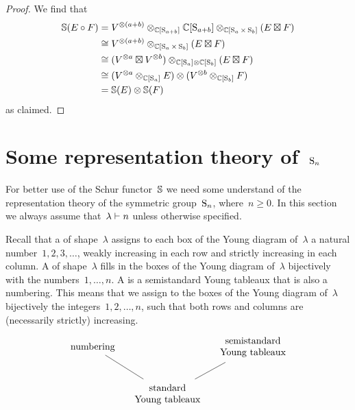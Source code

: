 \documentclass[a4paper,10pt]{scrartcl}
\begin{document}
\begin{proof}
  We find that
  \begin{align*}
    \mathbb{S}(E \circ F)
    &=
    V^{\otimes (a+b)}
    \otimes_{\mathbb{C}[\operatorname{S}_{a+b}]}
    \mathbb{C}[\operatorname{S}_{a+b}]
    \otimes_{\mathbb{C}[\operatorname{S}_a \times \operatorname{S}_b]}
    (E \boxtimes F)
    \\
    &\cong
    V^{\otimes (a+b)}
    \otimes_{\mathbb{C}[\operatorname{S}_a \times \operatorname{S}_b]}
    (E \boxtimes F)
    \\
    &\cong
    (V^{\otimes a} \boxtimes V^{\otimes b})
    \otimes_{\mathbb{C}[\operatorname{S}_a] \otimes \mathbb{C}[\operatorname{S}_b]}
    (E \boxtimes F)
    \\
    &\cong
    (V^{\otimes a} \otimes_{\mathbb{C}[\operatorname{S}_a]} E)
    \otimes
    (V^{\otimes b} \otimes_{\mathbb{C}[\operatorname{S}_b]} F)
    \\
    &=
    \mathbb{S}(E) \otimes \mathbb{S}(F)
  \end{align*}
  as claimed.
\end{proof}





\section{Some representation theory of~$\operatorname{S}_n$}

For better use of the Schur functor~$\mathbb{S}$ we need some understand of the representation theory of the symmetric group~$\operatorname{S}_n$, where~$n \geq 0$.
In this section we always assume that~$\lambda \vdash n$ unless otherwise specified.

Recall that a  of shape~$\lambda$ assigns to each box of the Young diagram of~$\lambda$ a natural number~$1, 2, 3, \dotsc$, weakly increasing in each row and strictly increasing in each column.
A  of shape~$\lambda$ fills in the boxes of the Young diagram of~$\lambda$ bijectively with the numbers~$1, \dotsc, n$.
A  is a semistandard Young tableaux that is also a numbering.
This means that we assign to the boxes of the Young diagram of~$\lambda$ bijectively the integers~$1, 2, \dotsc, n$, such that both rows and columns are (necessarily strictly) increasing.
\[
  \begin{tikzcd}[column sep = small]
    \text{numbering}
    \arrow[dash]{dr}
    &
    {}
    &
    \begin{tabular}{@{}c@{}}
      semistandard \\
      Young tableaux
    \end{tabular}
    \arrow[dash]{dl}
    \\
    {}
    &
    \begin{tabular}{@{}c@{}}
      standard \\
      Young tableaux
    \end{tabular}
    &
    {}
  \end{tikzcd}
\]
\end{document}
